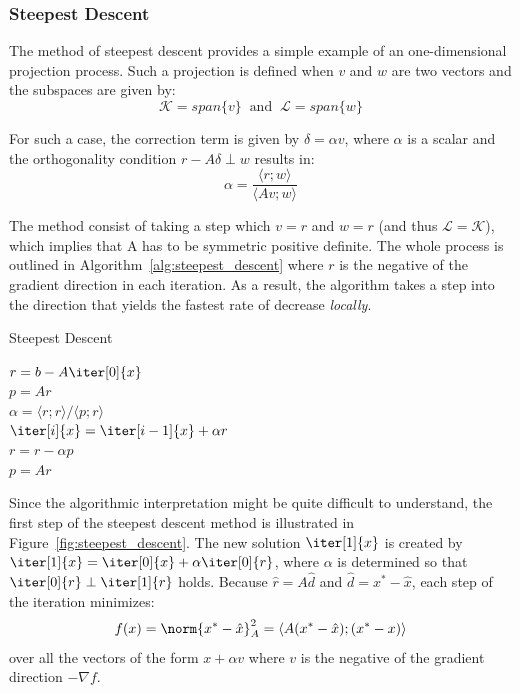 \subsubsection{Steepest Descent}
\label{sec:steepest_descent}

The method of steepest descent provides a simple example of an one-dimensional projection process. Such a projection is defined when $v$ and $w$ are two vectors and the subspaces are given by:
\begin{equation}
    \mathcal{K}=span\{v\}\;\; \text{and} \;\; \mathcal{L}=span\{w\}
\end{equation}

\noindent For such a case, the correction term is given by $\delta=\alpha v$, where $\alpha$ is a scalar and the orthogonality condition $r-A\delta \perp w$ results in:
\begin{equation}
    \alpha = \frac{\langle r;w\rangle}{\langle Av;w\rangle}
\end{equation}

\noindent The method consist of taking a step which $v=r$ and $w=r$ (and thus $\mathcal{L}=\mathcal{K}$), which implies that A has to be symmetric positive definite. The whole process is outlined in  Algorithm~\hyperref[alg:steepest_descent]{\ref{alg:steepest_descent}} where $r$ is the negative of the gradient direction in each iteration. As a result, the algorithm takes a step into the direction that yields the fastest rate of decrease \textit{locally}.

\begin{algorithm}[h]
  \caption{Steepest Descent}
  \label{alg:steepest_descent}
  \SetAlgoLined
  \DontPrintSemicolon
  $r = b-A\iter[0]{x}$ \\
  $p = Ar$ \\
   {
    $\alpha = \langle r;r \rangle / \langle p;r \rangle$ \\
    $\iter[i]{x} = \iter[i-1]{x}+\alpha r$ \\
    $r = r - \alpha p$ \\
    $p = Ar$ \\
  }
\end{algorithm}

\noindent Since the algorithmic interpretation might be quite difficult to understand, the first step of the steepest descent method is illustrated in Figure~\hyperref[fig:steepest_descent]{\ref{fig:steepest_descent}}. The new solution $\iter[1]{x}$ is created by $\iter[1]{x}=\iter[0]{x}+\alpha \iter[0]{r}$, where $\alpha$ is determined so that $\iter[0]{r} \perp \iter[1]{r}$ holds. Because $\hat{r}=A\hat{d}$ and $\hat{d}=x^*-\hat{x}$, each step of the iteration minimizes:
\begin{equation}
f(x) = \norm{x^*-\hat{x}}_A^2 = \langle A(x^*-\hat{x});(x^*-x)\rangle
\end{equation}
\noindent over all the vectors of the form $x+\alpha v$ where $v$ is the negative of the gradient direction $-\nabla f$.

